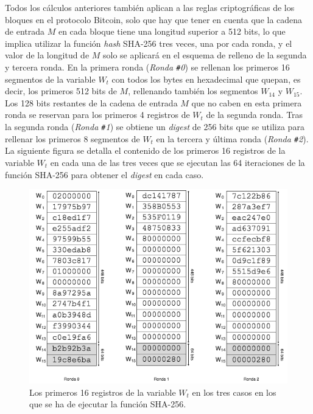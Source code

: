 \documentclass{article}
\begin{document}
    Todos los cálculos anteriores también aplican a las reglas criptográficas de los bloques en el protocolo Bitcoin, solo que hay que tener en cuenta que la cadena de entrada $M$ en cada bloque tiene una longitud superior a 512 bits, lo que implica utilizar la función \textit{hash} SHA-256 tres veces, una por cada ronda, y el valor de la longitud de $M$ solo se aplicará en el esquema de relleno de la segunda y tercera ronda. En la primera ronda (\textit{Ronda \texttt{\#}0}) se rellenan los primeros 16 segmentos de la variable $W_t$ con todos los bytes en hexadecimal que quepan, es decir, los primeros 512 bits de $M$, rellenando también los segmentos $W_{14}$ y $W_{15}$. Los 128 bits restantes de la cadena de entrada $M$ que no caben en esta primera ronda se reservan para los primeros 4 registros de $W_t$ de la segunda ronda. Tras la segunda ronda (\textit{Ronda \texttt{\#}1}) se obtiene un \textit{digest} de 256 bits que se utiliza para rellenar los primeros 8 segmentos de $W_t$ en la tercera y última ronda (\textit{Ronda \texttt{\#}2}). La siguiente figura se detalla el contenido de los primeros 16 registros de la variable $W_{t}$ en cada una de las tres veces que se ejecutan las 64 iteraciones de la función SHA-256 para obtener el \textit{digest} en cada caso.
    \begin{figure}[H]
    \centering
        \includegraphics[scale=0.59]{img/Bitcoin_block_SHA_256_W0_W15_x3}
        \caption{Los primeros 16 registros de la variable $W_{t}$ en los tres casos en los que se ha de ejecutar la función SHA-256.}
    \end{figure}
    
\end{document}
